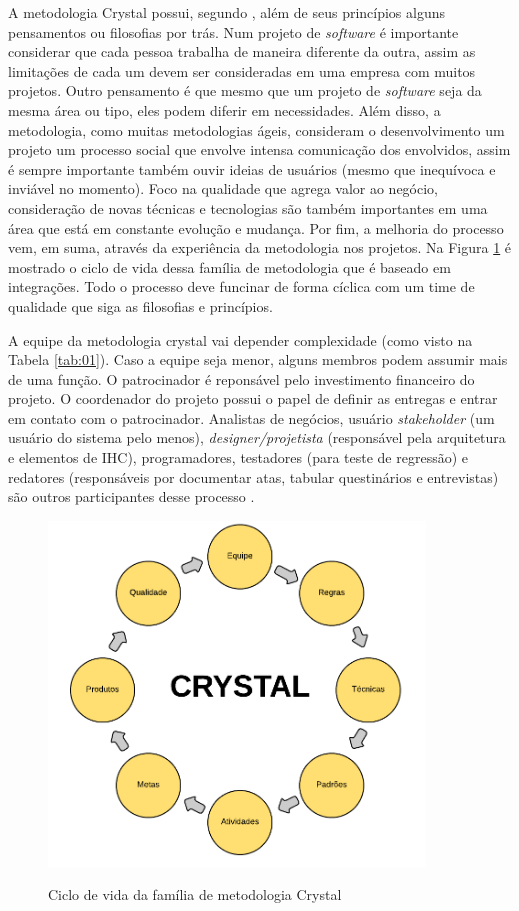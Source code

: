 A metodologia Crystal possui, segundo , além de seus princípios alguns pensamentos ou filosofias por trás. Num projeto de \textit{software} é importante considerar que cada pessoa trabalha de maneira diferente da outra, assim as limitações de cada um devem ser consideradas em uma empresa com muitos projetos. Outro pensamento é que mesmo que um projeto de \textit{software} seja da mesma área ou tipo, eles podem diferir em necessidades. Além disso, a metodologia, como muitas metodologias ágeis, consideram o desenvolvimento um projeto um processo social que envolve intensa comunicação dos envolvidos, assim é sempre importante também ouvir ideias de usuários (mesmo que inequívoca e inviável no momento). Foco na qualidade que agrega valor ao negócio, consideração de novas técnicas e tecnologias são também importantes em uma área que está em constante evolução e mudança. Por fim, a melhoria do processo vem, em suma, através da experiência da metodologia nos projetos. Na Figura \ref{fig:11} é mostrado o ciclo de vida dessa família de metodologia que é baseado em integrações. Todo o processo deve funcinar de forma cíclica com um time de qualidade que siga as filosofias e princípios.

A equipe da metodologia crystal vai depender complexidade (como visto na Tabela \ref{tab:01}). Caso a equipe seja menor, alguns membros podem assumir mais de uma função. O patrocinador é reponsável pelo investimento financeiro do projeto. O coordenador do projeto possui o papel de definir as entregas e entrar em contato com o patrocinador. Analistas de negócios, usuário \textit{stakeholder} (um usuário do sistema pelo menos), \textit{designer/projetista} (responsável pela arquitetura e elementos de IHC), programadores, testadores (para teste de regressão) e redatores (responsáveis por documentar atas, tabular questinários e entrevistas) são outros participantes desse processo \cite{macedo:12}. 


\begin{figure}[htb!]
\begin{center}
\caption{Ciclo de vida da família de metodologia Crystal}
\label{fig:11}
\includegraphics[width=10cm]{assets/crystal} \\
\end{center}
\end{figure}

